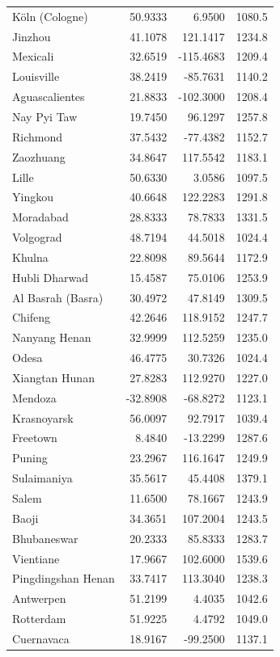 \begin{longtable}{lrrc}
Köln (Cologne) & 50.9333 & 6.9500 & 1080.5 \\
Jinzhou & 41.1078 & 121.1417 & 1234.8 \\
Mexicali & 32.6519 & -115.4683 & 1209.4 \\
Louisville & 38.2419 & -85.7631 & 1140.2 \\
Aguascalientes & 21.8833 & -102.3000 & 1208.4 \\
Nay Pyi Taw & 19.7450 & 96.1297 & 1257.8 \\
Richmond & 37.5432 & -77.4382 & 1152.7 \\
Zaozhuang & 34.8647 & 117.5542 & 1183.1 \\
Lille & 50.6330 & 3.0586 & 1097.5 \\
Yingkou & 40.6648 & 122.2283 & 1291.8 \\
Moradabad & 28.8333 & 78.7833 & 1331.5 \\
Volgograd & 48.7194 & 44.5018 & 1024.4 \\
Khulna & 22.8098 & 89.5644 & 1172.9 \\
Hubli Dharwad & 15.4587 & 75.0106 & 1253.9 \\
Al Basrah (Basra) & 30.4972 & 47.8149 & 1309.5 \\
Chifeng & 42.2646 & 118.9152 & 1247.7 \\
Nanyang  Henan & 32.9999 & 112.5259 & 1235.0 \\
Odesa & 46.4775 & 30.7326 & 1024.4 \\
Xiangtan  Hunan & 27.8283 & 112.9270 & 1227.0 \\
Mendoza & -32.8908 & -68.8272 & 1123.1 \\
Krasnoyarsk & 56.0097 & 92.7917 & 1039.4 \\
Freetown & 8.4840 & -13.2299 & 1287.6 \\
Puning & 23.2967 & 116.1647 & 1249.9 \\
Sulaimaniya & 35.5617 & 45.4408 & 1379.1 \\
Salem & 11.6500 & 78.1667 & 1243.9 \\
Baoji & 34.3651 & 107.2004 & 1243.5 \\
Bhubaneswar & 20.2333 & 85.8333 & 1283.7 \\
Vientiane & 17.9667 & 102.6000 & 1539.6 \\
Pingdingshan  Henan & 33.7417 & 113.3040 & 1238.3 \\
Antwerpen & 51.2199 & 4.4035 & 1042.6 \\
Rotterdam & 51.9225 & 4.4792 & 1049.0 \\
Cuernavaca & 18.9167 & -99.2500 & 1137.1 \\

\end{longtable}
